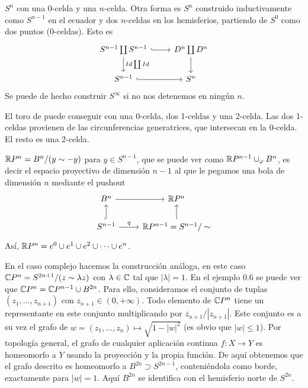 \documentclass[TA.tex]{subfiles}
\begin{document}
\begin{ej}
$S^n$ con una 0-celda y una $n$-celda. Otra forma es $S^n$ construido inductivamente como $S^{n-1}$ en el ecuador y dos $n$-celdas en los hemisferios, partiendo de $S^0$ como dos puntos (0-celdas). Esto es
\[
\begin{tikzcd}
S^{n-1}\coprod S^{n-1}\arrow[r, hookrightarrow]\arrow[d, "Id\coprod Id"] & D^n\coprod D^n\arrow[d]\\
S^{n-1}\arrow[r, hookrightarrow] & S^n
\end{tikzcd}
\]  
Se puede de hecho construir $S^{\infty}$ si no nos detenemos en ningún $n$. 
\end{ej}

\begin{ej}
El toro de puede conseguir con una 0-celda, dos 1-celdas y una 2-celda. Las dos 1-celdas provienen de las circunferencias generatrices, que intersecan en la 0-celda. El resto es una 2-celda.
\end{ej}

\begin{ej}
$\mathbb{R} P^n=B^n/(y\sim -y)$ para $y\in S^{n-1}$, que se puede ver como $\mathbb{R} P^{n-1}\cup_{\varphi} B^n$, es decir el espacio proyectivo de dimensión $n-1$ al que le pegamos una bola de dimensión $n$ mediante el pushout
\[
\begin{tikzcd}
B^n\arrow[r] & \R P^n\\
S^{n-1}\arrow[u, hookrightarrow]\arrow[r, "q"] & \R P^{n-1}=S^{n-1}/\sim\arrow[u]
\end{tikzcd}
\]
Así, $\mathbb{R} P^n=e^0\cup e^1\cup e^2\cup\cdots\cup e^n$. 

En el caso complejo hacemos la construcción análoga, en este caso $\mathbb{C} P^n=S^{2n+1}/(z\sim\lambda z)$ con $\lambda\in\mathbb{C}$ tal que $|\lambda|=1$. En el ejemplo 0.6 se puede ver que $\mathbb{C} P^n=\mathbb{C} P^{n-1}\cup B^{2n}$. Para ello, consideramos el conjunto de tuplas $(z_1,\dots, z_{n+1})$ con $z_{n+1}\in (0,+\infty)$. Todo elemento de $\mathbb{C} P^n$ tiene un representante en este conjunto multiplicando por $\overline{z}_{n+1}/|z_{n+1}|$. Este conjunto es a su vez el grafo de $w=(z_1,\dots, z_n)\mapsto \sqrt{1-|w|^2}$ (es obvio que $|w|\leq 1$). Por topología general, el grafo de cualquier aplicación continua $f:X\to Y$ es homeomorfo a $Y$ usando la proyección y la propia función. De aquí obtenemos que el grafo descrito es homeomorfo a $B^{2n}\supset S^{2n-1}$, conteniéndola como borde, exactamente para $|w|=1$. Aquí $B^{2n}$ se identifica con el hemisferio norte de $S^{2n}$. 

\end{ej}
\end{document}
